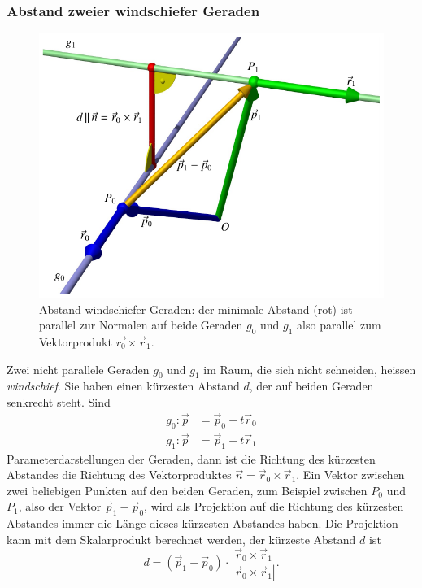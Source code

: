 \subsubsection{Abstand zweier windschiefer Geraden}
\begin{figure}
\begin{center}
\includegraphics{5/images/windschief.pdf}
\end{center}
\caption{Abstand windschiefer Geraden: der minimale Abstand (rot) ist
parallel zur Normalen auf beide Geraden $g_0$ und $g_1$ also parallel
zum Vektorprodukt $\vec{r_0}\times\vec{r}_1$.
\label{windschief}}
\end{figure}
Zwei nicht parallele Geraden $g_0$ und $g_1$ im Raum,
die sich nicht schneiden, heissen
{\em windschief}.
Sie haben
einen kürzesten Abstand $d$, der auf beiden Geraden senkrecht steht.
Sind
\begin{align*}
g_0:
\vec p&=\vec p_0+t\vec r_0\\
g_1:
\vec p&=\vec p_1+t\vec r_1
\end{align*}
Parameterdarstellungen der Geraden, dann ist die Richtung des kürzesten
Abstandes die Richtung des Vektorproduktes $\vec n = \vec r_0\times\vec r_1$.
Ein Vektor zwischen zwei beliebigen Punkten auf den beiden Geraden,
zum Beispiel zwischen $P_0$ und $P_1$, also der Vektor $\vec p_1-\vec p_0$,
wird als Projektion auf die Richtung des kürzesten Abstandes immer die
Länge dieses kürzesten Abstandes haben.
Die Projektion kann mit dem
Skalarprodukt berechnet werden, der kürzeste Abstand $d$ ist
\[
d=(\vec p_1-\vec p_0)\cdot\frac{\vec r_0\times\vec r_1}{|\vec r_0\times\vec r_1|}.
\]

